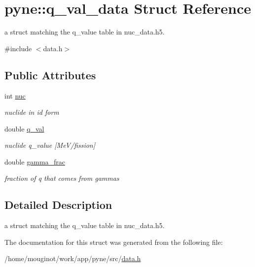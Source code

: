 \hypertarget{structpyne_1_1q__val__data}{}\section{pyne\+:\+:q\+\_\+val\+\_\+data Struct Reference}
\label{structpyne_1_1q__val__data}


a struct matching the q\+\_\+value table in nuc\+\_\+data.\+h5.  




{\ttfamily \#include $<$data.\+h$>$}

\subsection*{Public Attributes}
\begin{DoxyCompactItemize}
\item 
\mbox{\label{structpyne_1_1q__val__data_a39dbf1ad0347f0f68f09c94a9ff9157f}} 
int \hyperlink{structpyne_1_1q__val__data_a39dbf1ad0347f0f68f09c94a9ff9157f}{nuc}
\begin{DoxyCompactList}\small\item\em nuclide in id form \end{DoxyCompactList}\item 
\mbox{\label{structpyne_1_1q__val__data_a8016ec428535fddb8cba5005511d4a8a}} 
double \hyperlink{structpyne_1_1q__val__data_a8016ec428535fddb8cba5005511d4a8a}{q\+\_\+val}
\begin{DoxyCompactList}\small\item\em nuclide q\+\_\+value \mbox{[}Me\+V/fission\mbox{]} \end{DoxyCompactList}\item 
\mbox{\label{structpyne_1_1q__val__data_a5d47c172a924715d567a1b6119e20830}} 
double \hyperlink{structpyne_1_1q__val__data_a5d47c172a924715d567a1b6119e20830}{gamma\+\_\+frac}
\begin{DoxyCompactList}\small\item\em fraction of q that comes from gammas \end{DoxyCompactList}\end{DoxyCompactItemize}


\subsection{Detailed Description}
a struct matching the q\+\_\+value table in nuc\+\_\+data.\+h5. 

The documentation for this struct was generated from the following file\+:\begin{DoxyCompactItemize}
\item 
/home/mouginot/work/app/pyne/src/\hyperlink{data_8h}{data.\+h}\end{DoxyCompactItemize}
